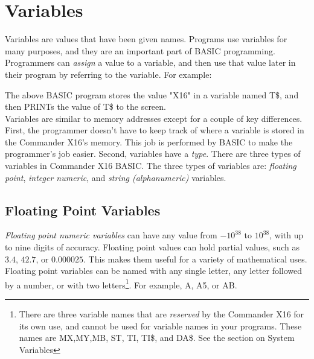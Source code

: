 \section{Variables}

Variables are values that have been given names.  Programs use variables for
many purposes, and they are an important part of BASIC programming.
Programmers can \emph{assign} a value to a variable, and then use that value
later in their program by referring to the variable.  For example:\\


The above BASIC program stores the value {\ttfamily "X16"} in a variable named
{\ttfamily T\$}, and then {\ttfamily PRINT}s the value of {\ttfamily T\$} to
the screen.\\

Variables are similar to memory addresses except for a couple of key
differences.  First, the programmer doesn't have to keep track of where a
variable is stored in the Commander X16's memory.  This job is performed by
BASIC to make the programmer's job easier.  Second, variables have a
\emph{type}.  There are three types of variables in Commander X16 BASIC.  The
three types of variables are: \emph{floating point}, \emph{integer numeric},
and \emph{string (alphanumeric)} variables.\\

\subsection{Floating Point Variables}

\emph{Floating point numeric variables} can have any value from $-10^{38}$ to
$10^{38}$, with up to nine digits of accuracy.  Floating point values can hold
partial values, such as $3.4$, $42.7$, or $0.000025$.  This makes them useful
for a variety of mathematical uses.  Floating point variables can be named with
any single letter, any letter followed by a number, or with two
letters\footnote{There are three variable names that are \emph{reserved} by the
Commander X16 for its own use, and cannot be used for variable names in your
programs.  These names are {\ttfamily MX},{\ttfamily MY},{\ttfamily MB},
{\ttfamily ST}, {\ttfamily TI}, {\ttfamily TI\$}, and {\ttfamily DA\$}.   See
the section on System Variables}.  For example, {\ttfamily A}, {\ttfamily A5},
or {\ttfamily AB}.\\

